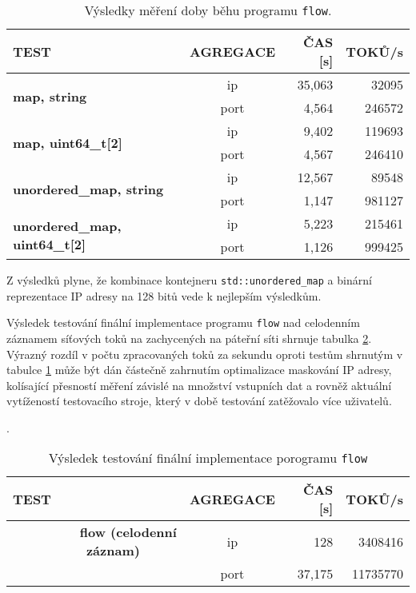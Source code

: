 \documentclass[12pt,a4paper,titlepage,final]{article}
\begin{document}
\begin{table}[htbp]
  \centering
  \caption{Výsledky měření doby běhu programu \texttt{flow}.}
    \begin{tabular}{rcrr}
    \multicolumn{1}{l}{\textbf{TEST}} & \textbf{AGREGACE} & \textbf{ČAS [s]} & \textbf{TOKŮ/s} \\
    \hline
    \multicolumn{1}{l}{\multirow{2}[1]{*}{\textbf{map, string}}} & ip    & 35,063 & 32095 \\
    \multicolumn{1}{l}{} & port  & 4,564 & 246572 \\
    \hline
    \multicolumn{1}{l}{\multirow{2}[0]{*}{\textbf{map, uint64\_t[2]}}} & ip    & 9,402 & 119693 \\
    \multicolumn{1}{l}{} & port  & 4,567 & 246410 \\
	\hline
    \multicolumn{1}{l}{\multirow{2}[0]{*}{\textbf{unordered\_map, string}}} & ip    & 12,567 & 89548 \\
    \multicolumn{1}{l}{} & port  & 1,147 & 981127 \\
	\hline
    \multicolumn{1}{l}{\multirow{2}[0]{*}{\textbf{unordered\_map, uint64\_t[2]}}} & ip    & 5,223 & 215461 \\
    \multicolumn{1}{l}{} & port  & 1,126 & 999425 \\
    \end{tabular}
  \label{tab:rychlosti}
\end{table}

Z výsledků plyne, že kombinace kontejneru \texttt{std::unordered\_map} a binární reprezentace IP adresy na 128 bitů vede k nejlepším výsledkům.

Výsledek testování finální implementace programu \texttt{flow} nad celodenním záznamem síťových toků na zachycených na páteřní síti shrnuje tabulka \ref{tab:final}. Výrazný rozdíl v počtu zpracovaných toků za sekundu oproti testům shrnutým v tabulce \ref{tab:rychlosti} může být dán částečně zahrnutím optimalizace maskování IP adresy, kolísající přesností měření závislé na množství vstupních dat a rovněž aktuální vytížeností testovacího stroje, který v době testování zatěžovalo více uživatelů.

\begin{table}[htbp]
  \centering
  \caption{Výsledek testování finální implementace porogramu \texttt{flow}}.
    \begin{tabular}{rcrr}
    \multicolumn{1}{l}{\textbf{TEST}} & \textbf{AGREGACE} & \textbf{ČAS [s]} & \textbf{TOKŮ/s}\\
    \hline
    \textbf{flow (celodenní záznam)~~~~~} & ip    & 128   & 3408416\\
          & port  & 37,175 & 11735770 \\
    \end{tabular}
  \label{tab:final}
\end{table}
\end{document}
